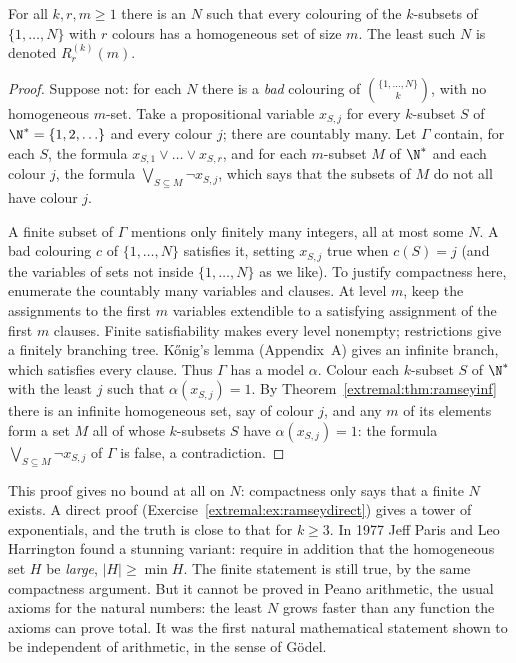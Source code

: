 \begin{theorem}\label{extremal:thm:ramseyfin}
For all $k,r,m\ge1$ there is an $N$ such that every colouring of the $k$-subsets of $\{1,\dots,N\}$ with $r$ colours has a homogeneous set of size $m$. The
least such $N$ is denoted $R^{(k)}_r(m)$.
\end{theorem}
\begin{proof}
Suppose not: for each $N$ there is a \emph{bad} colouring of $\binom{\{1,\dots,N\}}k$, with no homogeneous $m$-set. Take a propositional variable $x_{S,j}$ for every $k$-subset $S$
of $\N^*=\{1,2,\ldots\}$ and every colour $j$; there are countably many. Let $\Gamma$ contain, for each $S$, the formula $x_{S,1}\lor\dots\lor x_{S,r}$, and for each $m$-subset $M$ of $\N^*$ and each colour
$j$, the formula $\bigvee_{S\subseteq M}\neg x_{S,j}$, which says that the subsets of $M$ do not all have colour $j$.

A finite subset of $\Gamma$ mentions only finitely many integers, all at most some $N$. A bad colouring $c$ of $\{1,\dots,N\}$ satisfies it, setting $x_{S,j}$ true when
$c(S)=j$ (and the variables of sets not inside $\{1,\dots,N\}$ as we like). To justify compactness here, enumerate the countably many variables and clauses.
At level $m$, keep the assignments to the first $m$ variables extendible to a
satisfying assignment of the first $m$ clauses. Finite satisfiability makes every
level nonempty; restrictions give a finitely branching tree. K\H onig's lemma
(Appendix~A) gives an infinite branch, which satisfies every clause. Thus
$\Gamma$ has a model $\alpha$. Colour
each $k$-subset $S$ of $\N^*$ with the least $j$ such that $\alpha(x_{S,j})=1$. By Theorem~\ref{extremal:thm:ramseyinf} there is an infinite homogeneous set, say of colour $j$, and any
$m$ of its elements form a set $M$ all of whose $k$-subsets $S$ have $\alpha(x_{S,j})=1$: the formula $\bigvee_{S\subseteq M}\neg x_{S,j}$ of $\Gamma$ is false, a contradiction.
\end{proof}

This proof gives no bound at all on $N$: compactness only says that a finite $N$ exists. A direct proof (Exercise~\ref{extremal:ex:ramseydirect}) gives a tower of
exponentials, and the truth is close to that for $k\ge3$. In 1977 Jeff Paris and Leo Harrington found a stunning variant: require in addition that the homogeneous
set $H$ be \emph{large}, $|H|\ge\min H$. The finite statement is still true, by the same compactness argument. But it cannot be proved in Peano arithmetic, the
usual axioms for the natural numbers: the least $N$ grows faster than any function the axioms can prove total. It was the first natural mathematical
statement shown to be independent of arithmetic, in the sense of G\"odel.

